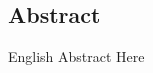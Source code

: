 \newpage
\thispagestyle{empty}
\begin{latin}
    \subsection*{Abstract}
    English Abstract Here
\end{latin}
\cleardoublepage